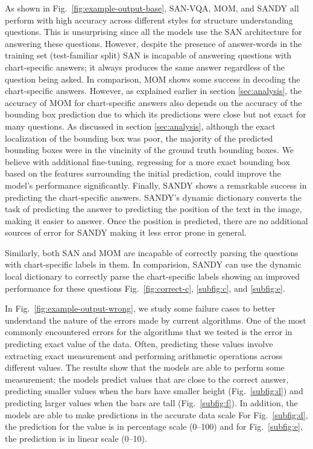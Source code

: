 \documentclass[10pt,twocolumn,letterpaper]{article}
\begin{document}
\begin{appendices}
As shown in Fig.~\ref{fig:example-output-base}, SAN-VQA, MOM, and SANDY all perform with high accuracy across different styles for structure understanding questions. This is unsurprising since all the models use the SAN architecture for answering these questions. However, despite the presence of answer-words in the training set (test-familiar split) SAN is incapable of answering questions with chart-specific answers; it always produces the same answer regardless of the question being asked. In comparison, MOM shows some success in decoding the chart-specific answers. However, as explained earlier in section \ref{sec:analysis}, the accuracy of MOM for chart-specific answers also depends on the accuracy of the bounding box prediction due to which its predictions were close but not exact for many questions. As discussed in section \ref{sec:analysis}, although the exact localization of the bounding box was poor, the majority of the predicted bounding boxes were in the vincinity of the ground truth bounding boxes. We believe with additional fine-tuning, \eg regressing for a more exact bounding box based on the features surrounding the initial prediction, could improve the model's performance significantly. Finally, SANDY shows a remarkable success in predicting the chart-specific answers. SANDY's dynamic dictionary converts the task of predicting the answer to predicting the position of the text in the image, making it easier to answer. Once the position is predicted, there are no additional sources of error for SANDY making it less error prone in general.

Similarly, both SAN and MOM are incapable of correctly parsing the questions with chart-specific labels in them. In comparision, SANDY can use the dynamic local dictionary to correctly parse the chart-specific labels showing an improved performance for these questions \eg Fig.~\ref{fig:correct-c}, \ref{subfig:c}, and \ref{subfig:e}.


In Fig.~\ref{fig:example-output-wrong}, we study some failure cases to better understand the nature of the errors made by current algorithms. One of the most commonly encountered errors for the algorithms that we tested is the error in predicting exact value of the data. Often, predicting these values involve extracting exact measurement and performing arithmetic operations across different values. The results show that the models are able to perform some measurement; the models predict values that are close to the correct answer, \eg predicting smaller values when the bars have smaller height (Fig.~\ref{subfig:d}) and predicting larger values when the bars are tall (Fig.~\ref{subfig:f}). In addition, the models are able to make predictions in the accurate data scale \eg For Fig.~\ref{subfig:d}, the prediction for the value is in percentage scale (0--100) and for Fig.~\ref{subfig:e}, the prediction is in linear scale (0--10).


\end{appendices}
\end{document}

